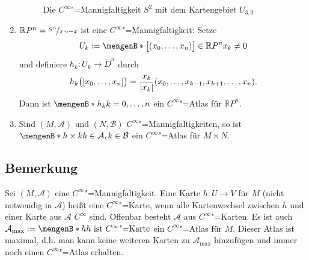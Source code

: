 \begin{enumerate}[(1)]
\begin{figure}[ht]
{\begin{tikzpicture}[scale=1.5]
		\end{tikzpicture}
		\caption{Die $C^\infty$"=Mannigfaltigkeit $S^2$ mit dem Kartengebiet $U_{3,0}$}}
	\end{figure}
	\item \label{154:enum:3} $\mathds{R}P^n = \nicefrac{S^n}{x \sim -x}$ ist eine $C^\infty$"=Mannigfaltigkeit: Setze 
	\[
		U_k := \set[{\benbrace[\big]{(x_0, \ldots, x_n)} \in \mathds{R}P^n}]{x_k \not= 0} 
	\]
	und definiere $h_k : U_k \to \mathring{D}^n$ durch
	\[
		h_k \enbrace[\big]{[x_0, \ldots, x_n]} = \frac{x_k}{\abs*{x_k}} \enbrace*{x_0, \ldots , x_{k-1}, x_{k+1}, \ldots, x_n} .  
	\]
	Dann ist $\set[h_k]{k=0,\ldots , n}$ ein $C^\infty$"=Atlas für $\mathds{R}P^n$.
	\item Sind $(M, \mathcal{A})$ und $(N, \mathcal{B})$ $C^\infty$"=Mannigfaltigkeiten, so ist $\set[h \times k]{h \in \mathcal{A}, k \in \mathcal{B}}$ ein
	$C^\infty$"=Atlas für $M \times N$.
\end{enumerate}

\subsection[Bemerkung: Maximaler Atlas]{Bemerkung} %
\label{sub:155}
Sei $(M,\mathcal{A})$ eine $C^\infty$"=Mannigfaltigkeit. Eine Karte $h : U \to V$ für $M$ (nicht notwendig in $\mathcal{A}$) heißt eine $C^\infty$"=Karte, wenn alle 
Kartenwechsel zwischen $h$ und einer Karte aus $\mathcal{A}$ $C^\infty$ sind. Offenbar besteht $\mathcal{A}$ aus $C^\infty$"=Karten. Es ist auch 
$\mathcal{A}_\mathrm{max} := \set[h]{h \text{ ist $C^\infty$"=Karte}}$ ein $C^\infty$"=Atlas für $M$. Dieser Atlas ist maximal, d.h. man kann keine weiteren Karten zu 
$\mathcal{A}_\mathrm{max}$ hinzufügen und immer noch einen $C^\infty$"=Atlas erhalten. 

